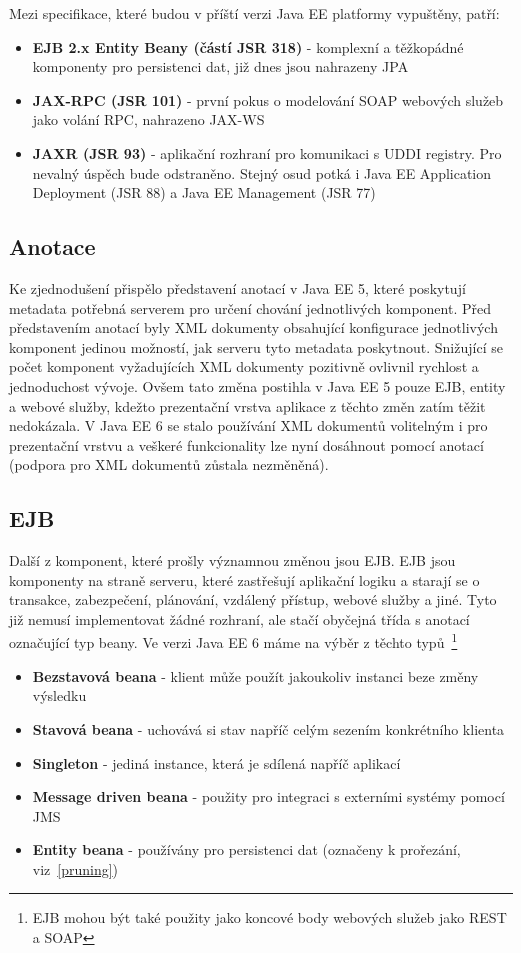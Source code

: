 \documentclass[122pt,oneside]{fithesis}
\begin{document}
Mezi specifikace, které budou v příští verzi Java EE platformy vypuštěny, patří:
\begin{itemize}
  \item {\bf EJB 2.x Entity Beany (částí JSR 318)} - komplexní a těžkopádné komponenty pro persistenci dat, již dnes jsou nahrazeny JPA
  \item {\bf JAX-RPC (JSR 101)} - první pokus o modelování SOAP webových služeb jako volání RPC, nahrazeno JAX-WS
  \item {\bf JAXR (JSR 93)} - aplikační rozhraní pro komunikaci s UDDI registry. Pro nevalný úspěch bude odstraněno. Stejný osud potká i Java EE Application Deployment (JSR 88) a Java EE Management (JSR 77)
\end{itemize}

\subsection{Anotace}
Ke zjednodušení přispělo představení anotací v Java EE 5, které poskytují metadata potřebná serverem pro určení chování jednotlivých komponent. Před představením anotací byly XML dokumenty obsahující konfigurace jednotlivých komponent jedinou možností, jak serveru tyto metadata poskytnout. Snižující se počet komponent vyžadujících XML dokumenty pozitivně ovlivnil rychlost a jednoduchost vývoje. Ovšem tato změna postihla v Java EE 5 pouze EJB, entity a webové služby, kdežto prezentační vrstva aplikace z těchto změn zatím těžit nedokázala. V Java EE 6 se stalo používání XML dokumentů volitelným i pro prezentační vrstvu a veškeré funkcionality lze nyní dosáhnout pomocí anotací (podpora pro XML dokumentů zůstala nezměněná).


\subsection{EJB}
Další z komponent, které prošly významnou změnou jsou EJB. EJB jsou komponenty na straně serveru, které zastřešují aplikační logiku a starají se o transakce, zabezpečení, plánování, vzdálený přístup, webové služby a jiné. Tyto již nemusí implementovat žádné rozhraní, ale stačí obyčejná třída s anotací označující typ beany. Ve verzi Java EE 6 máme na výběr z těchto typů~\footnote{EJB mohou být také použity jako koncové body webových služeb jako REST a SOAP}

\begin{itemize}
  \item {\bf Bezstavová beana} - klient může použít jakoukoliv instanci beze změny výsledku
  \item {\bf Stavová beana} - uchovává si stav napříč celým sezením konkrétního klienta
  \item {\bf Singleton} - jediná instance, která je sdílená napříč aplikací
  \item {\bf Message driven beana} - použity pro integraci s externími systémy pomocí JMS
  \item {\bf Entity beana} -  používány pro persistenci dat (označeny k prořezání, viz~\ref{pruning})
\end{itemize}
\end{document}

